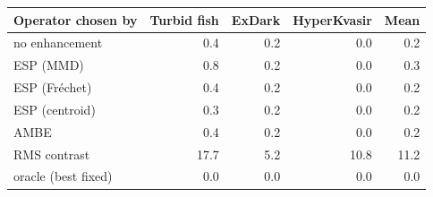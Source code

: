 \begin{tabular}{lrrrr}
\toprule
Operator chosen by & Turbid fish & ExDark & HyperKvasir & Mean \\
\midrule
no enhancement & 0.4 & 0.2 & 0.0 & 0.2 \\
ESP (MMD) & 0.8 & 0.2 & 0.0 & 0.3 \\
ESP (Fr\'echet) & 0.4 & 0.2 & 0.0 & 0.2 \\
ESP (centroid) & 0.3 & 0.2 & 0.0 & 0.2 \\
AMBE & 0.4 & 0.2 & 0.0 & 0.2 \\
RMS contrast & 17.7 & 5.2 & 10.8 & 11.2 \\
oracle (best fixed) & 0.0 & 0.0 & 0.0 & 0.0 \\
\bottomrule
\end{tabular}